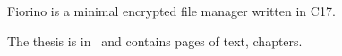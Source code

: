 Fiorino is a minimal encrypted file manager written in C17.


The thesis is in \langEng~and contains \calculatepages pages of text, 
 chapters.